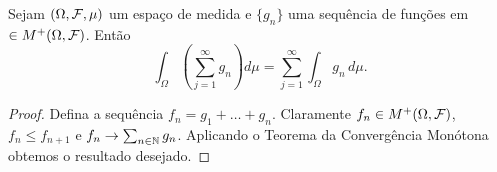 \begin{corolario}
Sejam $(\Omega,\mathcal{F},\mu)$ um espaço de medida e 
$\{g_n\}$ uma sequência de funções em 
$\in M^{+}(\Omega,\mathcal{F})$. Então 
	\[
		\int_{\Omega} \left(\sum_{j=1}^{\infty} g_n\right) d\mu
		=
		\sum_{j=1}^{\infty}\int_{\Omega}  g_n\, d\mu.
	\]  
\end{corolario}


\begin{proof}
Defina a sequência $f_n=g_1+\ldots+g_n$.
Claramente $f_n\in M^{+}(\Omega,\mathcal{F})$,
$f_n\leq f_{n+1}$ e $f_n\to \sum_{n\in \mathbb{N}} g_n$. 
Aplicando o Teorema da Convergência Monótona obtemos o resultado
desejado.
\end{proof}









